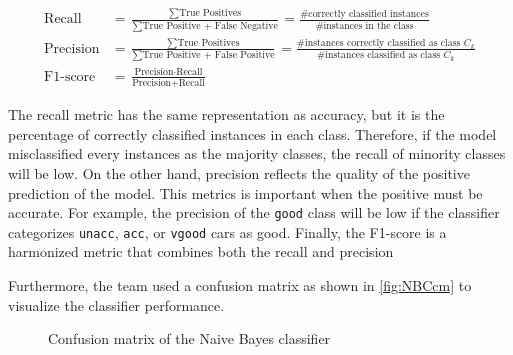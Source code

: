 \documentclass[a4paper]{article}
\begin{document}
\begin{subequations}
\begin{align}
  \text{Recall} &= \frac{\sum \text{True Positives}}{\sum \text{True Positive + False Negative}} = \frac{\text{\# correctly classified instances}}{\text{\# instances in the class}} \\
  \text{Precision} &= \frac{\sum \text{True Positives}}{\sum \text{True Positive + False Positive}} = \frac{\text{\# instances correctly classified as class } C_k}{\text{\# instances classified as class } C_k} \\
  \text{F1-score} &= \frac{\text{Precision}\cdot\text{Recall}}{\text{Precision}+\text{Recall}}
\end{align}
\end{subequations}

The recall metric has the same representation as accuracy, but it is the percentage of correctly classified instances in each class. Therefore, if the model misclassified every instances as the majority classes, the recall of minority classes will be low. On the other hand, precision reflects the quality of the positive prediction of the model. This metrics is important when the positive must be accurate. For example, the precision of the \lstinline{good} class will be low if the classifier categorizes \lstinline{unacc}, \lstinline{acc}, or \lstinline{vgood} cars as good. Finally, the F1-score is a harmonized metric that combines both the recall and precision

Furthermore, the team used a confusion matrix as shown in \autoref{fig:NBCcm} to visualize the classifier performance.

\begin{figure} [h!]
  \caption{Confusion matrix of the Naive Bayes classifier} 
  \label{fig:NBCcm}
\end{figure}
\end{document}
